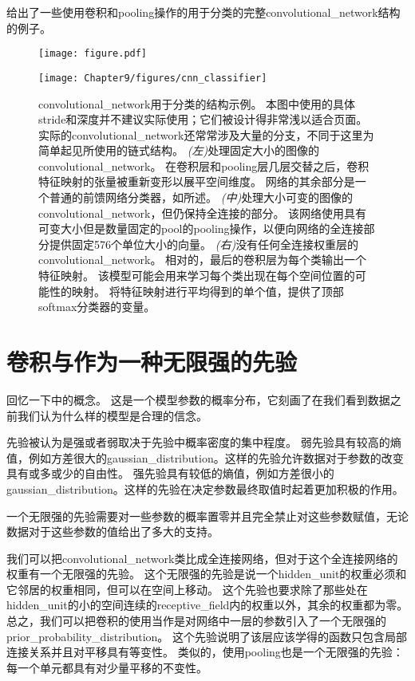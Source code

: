 给出了一些使用卷积和\gls{pooling}操作的用于分类的完整\gls{convolutional_network}结构的例子。
\begin{figure}[!htb]
\ifOpenSource
\centerline{\texttt{[image: figure.pdf]}}
\else
\centerline{\texttt{[image: Chapter9/figures/cnn\_classifier]}}
\fi
\caption{\gls{convolutional_network}用于分类的结构示例。
本图中使用的具体\gls{stride}和深度并不建议实际使用；它们被设计得非常浅以适合页面。
实际的\gls{convolutional_network}还常常涉及大量的分支，不同于这里为简单起见所使用的链式结构。
\emph{(左)}处理固定大小的图像的\gls{convolutional_network}。
在卷积层和\gls{pooling}层几层交替之后，卷积特征映射的张量被重新变形以展平空间维度。
网络的其余部分是一个普通的前馈网络分类器，如所述。
\emph{(中)}处理大小可变的图像的\gls{convolutional_network}，但仍保持全连接的部分。
该网络使用具有可变大小但是数量固定的\gls{pool}的\gls{pooling}操作，以便向网络的全连接部分提供固定576个单位大小的向量。 
\emph{(右)}没有任何全连接权重层的\gls{convolutional_network}。
相对的，最后的卷积层为每个类输出一个特征映射。
该模型可能会用来学习每个类出现在每个空间位置的可能性的映射。
将特征映射进行平均得到的单个值，提供了顶部softmax分类器的变量。}
\label{fig:chap9_cnn_classifier}
\end{figure}

\section{卷积与作为一种无限强的先验}
\label{sec:convolution_and_pooling_as_an_infinitely_strong_prior}

回忆一下中的概念。
这是一个模型参数的概率分布，它刻画了在我们看到数据之前我们认为什么样的模型是合理的信念。

 
先验被认为是强或者弱取决于先验中概率密度的集中程度。
弱先验具有较高的熵值，例如方差很大的\gls{gaussian_distribution}。这样的先验允许数据对于参数的改变具有或多或少的自由性。
强先验具有较低的熵值，例如方差很小的\gls{gaussian_distribution}。这样的先验在决定参数最终取值时起着更加积极的作用。

一个无限强的先验需要对一些参数的概率置零并且完全禁止对这些参数赋值，无论数据对于这些参数的值给出了多大的支持。

我们可以把\gls{convolutional_network}类比成全连接网络，但对于这个全连接网络的权重有一个无限强的先验。
这个无限强的先验是说一个\gls{hidden_unit}的权重必须和它邻居的权重相同，但可以在空间上移动。
这个先验也要求除了那些处在\gls{hidden_unit}的小的空间连续的\gls{receptive_field}内的权重以外，其余的权重都为零。
总之，我们可以把卷积的使用当作是对网络中一层的参数引入了一个无限强的\gls{prior_probability_distribution}。
这个先验说明了该层应该学得的函数只包含局部连接关系并且对平移具有等变性。
类似的，使用\gls{pooling}也是一个无限强的先验：每一个单元都具有对少量平移的不变性。

